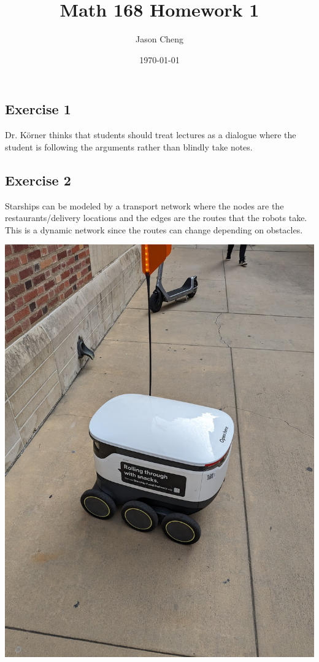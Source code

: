 \documentclass{article}
\title{Math 168 Homework 1}
\author{Jason Cheng}
\date{\today}
\begin{document}
\maketitle

\subsection*{Exercise 1}

Dr. Körner thinks that students should treat lectures as a dialogue where the
student is following the arguments rather than blindly take notes.

\newpage

\subsection*{Exercise 2}

Starships can be modeled by a transport network where the nodes are the
restaurants/delivery locations and the edges are the routes that the robots
take. This is a dynamic network since the routes can change depending on
obstacles.

\includegraphics[scale=0.25]{ex2.jpg}
\end{document}
